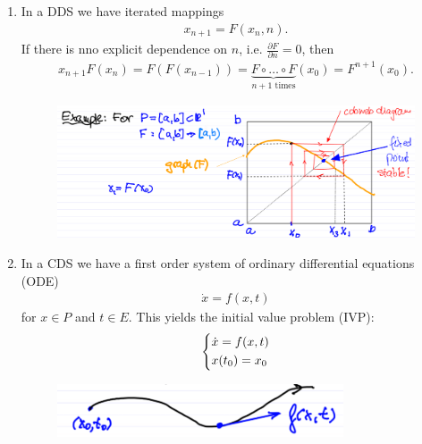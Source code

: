 \begin{enumerate}
	\item In a DDS we have iterated mappings 
	\begin{align}
		\boxed{x_{n+1} = F(x_n , n).}	
	\end{align}
	If there is nno explicit dependence on $n$, i.e. $\frac{\partial F}{\partial n} = 0$, then 
	\begin{align}
		\boxed{ x_{n+1} F(x_n) = F(F(x_{n-1})) = \underbrace{F \circ \ldots \circ F}_{n+1 \textrm{ times} }(x_0) = F^{n+1}(x_0).}
	\end{align}
\begin{ex}[]
	\begin{figure}[h]
	\centering
	\includegraphics[width = \textwidth]{figures/intro/1DDS.png}
\end{figure}
\end{ex}

\item In a CDS we have a first order system of ordinary differential equations (ODE)
	\begin{align}
		\boxed{
			\dot{x} = f(x,t)
		}
	\end{align}
	for $x\in P$ and $t \in E$. This yields the initial value problem (IVP):
	\begin{align}
		\begin{dcases}
			\dot{x} = f(x,t) \\
			x(t_0) = x_0
		\end{dcases}
	\end{align}
	\begin{figure}[h]
	\centering
	\includegraphics[width = 0.8\textwidth]{figures/intro/2CDS.png}
	\end{figure}
	

\end{enumerate}
